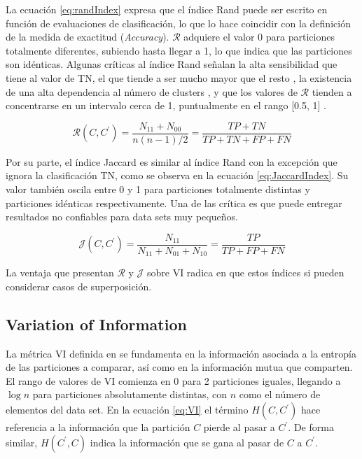 La ecuaci\'on \ref{eq:randIndex} expresa que el \'indice Rand puede ser escrito en funci\'on de evaluaciones de clasificaci\'on, lo que lo hace coincidir con la definici\'on de la medida de exactitud ({\it Accuracy}). $\mathcal{R}$ adquiere el valor 0 para particiones totalmente diferentes, subiendo hasta llegar a 1, lo que indica que las particiones son id\'enticas. Algunas cr\'iticas al \'indice Rand se\~nalan la alta sensibilidad que tiene al valor de TN, el que tiende a ser mucho mayor que el resto \cite{ben2001stability}, la existencia de una alta dependencia al n\'umero de clusters \cite{wagner2007comparing}, y que los valores de $\mathcal{R}$ tienden a concentrarse en un intervalo cerca de 1, puntualmente en el rango [0.5, 1] \cite{meilua2007comparing}\cite{vinh2010information}.

\begin{equation}
\mathcal{R}(C,C^{\prime}) = \frac{N_{11} + N_{00}}{n(n-1)/2} = \frac{TP + TN}{TP + TN + FP + FN}
\label{eq:randIndex}
\end{equation}

Por su parte, el \'indice Jaccard es similar al \'indice Rand con la excepci\'on que ignora la clasificaci\'on TN, como se observa en la ecuaci\'on \ref{eq:JaccardIndex}. Su valor tambi\'en oscila entre 0 y 1 para particiones totalmente distintas y particiones id\'enticas respectivamente. Una de las cr\'itica es que puede entregar resultados no confiables para data sets muy peque\~nos.

\begin{equation}
\mathcal{J}(C,C^{\prime}) = \frac{N_{11}}{N_{11} + N_{01} + N_{10}} = \frac{TP}{TP + FP + FN}
\label{eq:JaccardIndex}
\end{equation}

La ventaja que presentan $\mathcal{R}$ y $\mathcal{J}$ sobre VI radica en que estos \'indices si pueden considerar casos de superposici\'on.

\subsection{Variation of Information}
La m\'etrica VI definida en \cite{meilua2007comparing} se fundamenta en la informaci\'on asociada a la entrop\'ia de las particiones a comparar, as\'i como en la informaci\'on mutua que comparten. El rango de valores de VI comienza en 0 para 2 particiones iguales, llegando a $\log n$ para particiones absolutamente distintas, con $n$ como el n\'umero de elementos del data set. En la ecuaci\'on \ref{eq:VI} el t\'ermino $H(C,C^{\prime})$ hace referencia a la informaci\'on que la partici\'on $C$ pierde al pasar a $C^{\prime}$. De forma similar, $H(C^{\prime},C)$ indica la informaci\'on que se gana al pasar de $C$ a $C^{\prime}$.

